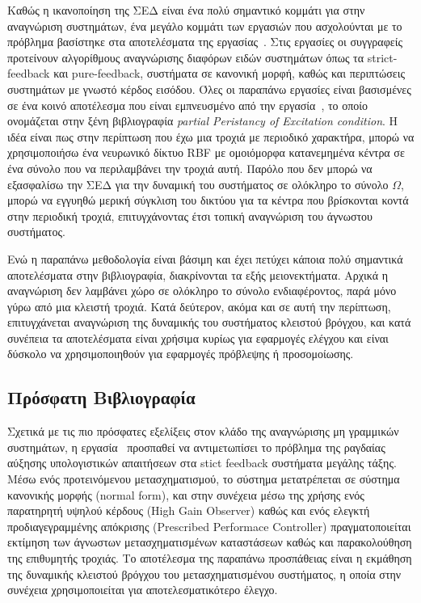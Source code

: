 Καθώς η ικανοποίηση της ΣΕΔ είναι ένα πολύ σημαντικό κομμάτι για στην αναγνώριση συστημάτων, ένα μεγάλο κομμάτι των εργασιών που ασχολούνται με το πρόβλημα βασίστηκε στα αποτελέσματα της εργασίας~\cite{kurdila1995persistency}. Στις εργασίες \cite{wang2003deterministic,wang2004learning,wang2006learning,liu2006learning,liu2007learning,liu2009learning,wang2012learning,wang2012learningpure,wang2013identification,dai2014dynamic,wang2014dynamic,wang2015learning} οι συγγραφείς προτείνουν αλγορίθμους αναγνώρισης διαφόρων ειδών συστημάτων όπως τα strict-feedback και pure-feedback, συστήματα σε κανονική μορφή, καθώς και περιπτώσεις συστημάτων με γνωστό κέρδος εισόδου. Όλες οι παραπάνω εργασίες είναι βασισμένες σε ένα κοινό αποτέλεσμα που είναι εμπνευσμένο από την εργασία~\cite{kurdila1995persistency}, το οποίο ονομάζεται στην ξένη βιβλιογραφία \textit{partial Peristancy of Excitation condition}. Η ιδέα είναι πως στην περίπτωση που έχω μια τροχιά με περιοδικό χαρακτήρα, μπορώ να χρησιμοποιήσω ένα νευρωνικό δίκτυο RBF με ομοιόμορφα κατανεμημένα κέντρα σε ένα σύνολο που να περιλαμβάνει την τροχιά αυτή. Παρόλο που δεν μπορώ να εξασφαλίσω την ΣΕΔ για την δυναμική του συστήματος σε ολόκληρο το σύνολο $\Omega$, μπορώ να εγγυηθώ μερική σύγκλιση του δικτύου για τα κέντρα που βρίσκονται κοντά στην περιοδική τροχιά, επιτυγχάνοντας έτσι τοπική αναγνώριση του άγνωστου συστήματος.

Ενώ η παραπάνω μεθοδολογία είναι βάσιμη και έχει πετύχει κάποια πολύ σημαντικά αποτελέσματα στην βιβλιογραφία, διακρίνονται τα εξής μειονεκτήματα. Αρχικά η αναγνώριση δεν λαμβάνει χώρο σε ολόκληρο το σύνολο ενδιαφέροντος, παρά μόνο γύρω από μια κλειστή τροχιά. Κατά δεύτερον, ακόμα και σε αυτή την περίπτωση, επιτυγχάνεται αναγνώριση της δυναμικής του συστήματος κλειστού βρόγχου, και κατά συνέπεια τα αποτελέσματα είναι χρήσιμα κυρίως για εφαρμογές ελέγχου και είναι δύσκολο να χρησιμοποιηθούν για εφαρμογές πρόβλεψης ή προσομοίωσης.

\subsection{Πρόσφατη Βιβλιογραφία}
Σχετικά με τις πιο πρόσφατες εξελίξεις στον κλάδο της αναγνώρισης μη γραμμικών συστημάτων, η εργασία~\cite{wang2016dynamic} προσπαθεί να αντιμετωπίσει το πρόβλημα της ραγδαίας αύξησης υπολογιστικών απαιτήσεων στα stict feedback συστήματα μεγάλης τάξης. Μέσω ενός προτεινόμενου μετασχηματισμού, το σύστημα μετατρέπεται σε σύστημα κανονικής μορφής (normal form), και στην συνέχεια μέσω της χρήσης ενός παρατηρητή υψηλού κέρδους (High Gain Observer) καθώς και ενός ελεγκτή προδιαγεγραμμένης απόκρισης (Prescribed Performace Controller) πραγματοποιείται εκτίμηση των άγνωστων μετασχηματισμένων καταστάσεων καθώς και παρακολούθηση της επιθυμητής τροχιάς. Το αποτέλεσμα της παραπάνω προσπάθειας είναι η εκμάθηση της δυναμικής κλειστού βρόγχου του μετασχηματισμένου συστήματος, η οποία στην συνέχεια χρησιμοποιείται για αποτελεσματικότερο έλεγχο.

